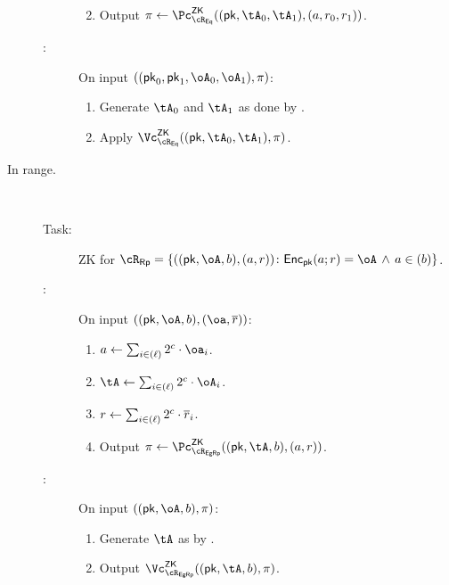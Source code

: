 \begin{description}
\begin{description}
\begin{enumerate}
\begin{enumerate}
		\end{enumerate}
		
		\item Output $\pi \asn \pZK{\rEgEq}((\pk,\tA_0,\tA_1), (a,r_0,r_1))$.
				 
	\end{enumerate}
	
	\item[\Vc:] On input $((\pk_0,\pk_1,\oA_0,\oA_1),\pi)$: 
	
	\begin{enumerate}
		\item Generate $\tA_0$ and  $\tA_1$ as done by \Pc.
		
	\item Apply $\vZK{\rEgEq}((\pk,\tA_0,\tA_1), \pi)$.
	
	\end{enumerate}
	
	\end{description}
		


  


\item[In range.]~  

\begin{description}
	\item[Task:] ZK for $\rRp =\rRpDef$.
	
	\item[\Pc:] On input $((\pk,\oA,b),(\oa,\orr))$:
	
	\begin{enumerate}
			\item   $a \asn  \sum_{i\in (\ell)}   2^c \cdot \oa_i$. 
		\item    $\tA \asn  \sum_{i\in (\ell)}    2^c \cdot \oA_i$. 
		\item    $r \leftarrow  \sum_{i\in (\ell)}  2^c \cdot \overline{r}_i$. 
        
        \item  Output $\pi \asn \pZK{\rEgRp}((\pk,\tA,b), (a,r))$.
        
	\end{enumerate}
	
	
\item[\Vc:] On input $((\pk,\oA,b),\pi)$:
	
	\begin{enumerate}
		\item   Generate $\tA$ as by \Pc.
		\item  Output $\vZK{\rEgRp}((\pk,\tA,b), \pi)$.
		
	\end{enumerate}
	

\end{description}
\end{description}
